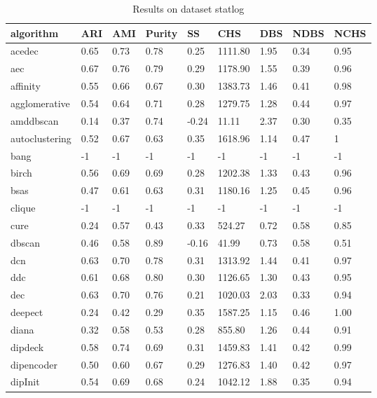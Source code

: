 \begin{table}[H]
\centering
\caption{Results on dataset statlog}
\label{S68_Table}
\begin{tabular}{|l|l|l|l|l|l|l|l|l|}
\hline
algorithm & ARI & AMI & Purity & SS & CHS & DBS & NDBS & NCHS \\
\hline
acedec & 0.65 & 0.73 & 0.78 & 0.25 & 1111.80 & 1.95 & 0.34 & 0.95 \\
\hline
aec & 0.67 & 0.76 & 0.79 & 0.29 & 1178.90 & 1.55 & 0.39 & 0.96 \\
\hline
affinity & 0.55 & 0.66 & 0.67 & 0.30 & 1383.73 & 1.46 & 0.41 & 0.98 \\
\hline
agglomerative & 0.54 & 0.64 & 0.71 & 0.28 & 1279.75 & 1.28 & 0.44 & 0.97 \\
\hline
amddbscan & 0.14 & 0.37 & 0.74 & -0.24 & 11.11 & 2.37 & 0.30 & 0.35 \\
\hline
autoclustering & 0.52 & 0.67 & 0.63 & 0.35 & 1618.96 & 1.14 & 0.47 & 1 \\
\hline
bang & -1 & -1 & -1 & -1 & -1 & -1 & -1 & -1 \\
\hline
birch & 0.56 & 0.69 & 0.69 & 0.28 & 1202.38 & 1.33 & 0.43 & 0.96 \\
\hline
bsas & 0.47 & 0.61 & 0.63 & 0.31 & 1180.16 & 1.25 & 0.45 & 0.96 \\
\hline
clique & -1 & -1 & -1 & -1 & -1 & -1 & -1 & -1 \\
\hline
cure & 0.24 & 0.57 & 0.43 & 0.33 & 524.27 & 0.72 & 0.58 & 0.85 \\
\hline
dbscan & 0.46 & 0.58 & 0.89 & -0.16 & 41.99 & 0.73 & 0.58 & 0.51 \\
\hline
dcn & 0.63 & 0.70 & 0.78 & 0.31 & 1313.92 & 1.44 & 0.41 & 0.97 \\
\hline
ddc & 0.61 & 0.68 & 0.80 & 0.30 & 1126.65 & 1.30 & 0.43 & 0.95 \\
\hline
dec & 0.63 & 0.70 & 0.76 & 0.21 & 1020.03 & 2.03 & 0.33 & 0.94 \\
\hline
deepect & 0.24 & 0.42 & 0.29 & 0.35 & 1587.25 & 1.15 & 0.46 & 1.00 \\
\hline
diana & 0.32 & 0.58 & 0.53 & 0.28 & 855.80 & 1.26 & 0.44 & 0.91 \\
\hline
dipdeck & 0.58 & 0.74 & 0.69 & 0.31 & 1459.83 & 1.41 & 0.42 & 0.99 \\
\hline
dipencoder & 0.50 & 0.60 & 0.67 & 0.29 & 1276.83 & 1.40 & 0.42 & 0.97 \\
\hline
dipInit & 0.54 & 0.69 & 0.68 & 0.24 & 1042.12 & 1.88 & 0.35 & 0.94 \\
\hline

\end{tabular}
\end{table}
